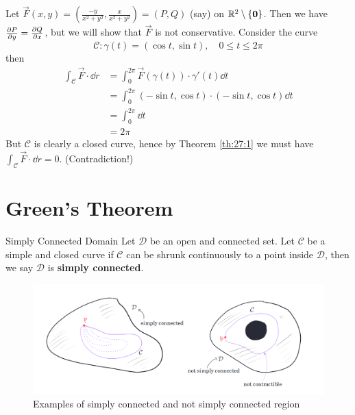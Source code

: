 \documentclass[../Analysis-3.tex]{subfiles}
\begin{document}
\begin{Eg}{}{}
  Let $\vec{F}(x,y) = \left( \frac{-y}{x^2+y^2}, \frac{x}{x^2+y^2} \right) = (P,Q)$ (say) on $\mathbb{R}^2 \setminus \{\mathbf{0}\}$. Then we have $\pdv{P}{y} = \pdv{Q}{x}$, but we will show that $\vec{F}$ is not conservative. Consider the curve
  \[
    \mathcal{C} : \gamma(t) = ( \cos t, \sin t), \quad 0 \leq t \leq 2\pi
  \]
  then
  \begin{align*}
    \int_{\mathcal{C}} \vec{F} \cdot \dd r & = \int_0^{2\pi}  \vec{F}(\gamma(t))\cdot \gamma'(t)  \dd t       \\
                                           & = \int_0^{2\pi}  (-\sin t, \cos t) \cdot (-\sin t, \cos t) \dd t \\
                                           & = \int_0^{2\pi} \dd t                                            \\
                                           & = 2\pi
  \end{align*}
  But $\mathcal{C}$ is clearly a closed curve, hence by Theorem \ref{th:27:1} we must have $\int_{\mathcal{C}} \vec{F} \cdot \dd r = 0$. (Contradiction!)
\end{Eg}

\section{Green's Theorem}

\begin{Def}{Simply Connected Domain}{}
  Let $\mathcal{D}$ be an open and connected set. Let $\mathcal{C}$ be a simple and closed curve if $\mathcal{C}$ can be shrunk continuously to a point inside $\mathcal{D}$, then we say $\mathcal{D}$ is \textbf{simply connected}.
\end{Def}

\begin{figure}[h]
  \centering
  \includegraphics[width=\textwidth]{../figures/lec27.4.png}
  \caption{Examples of simply connected and not simply connected region}
  \label{fig4:27}
\end{figure}
\end{document}
